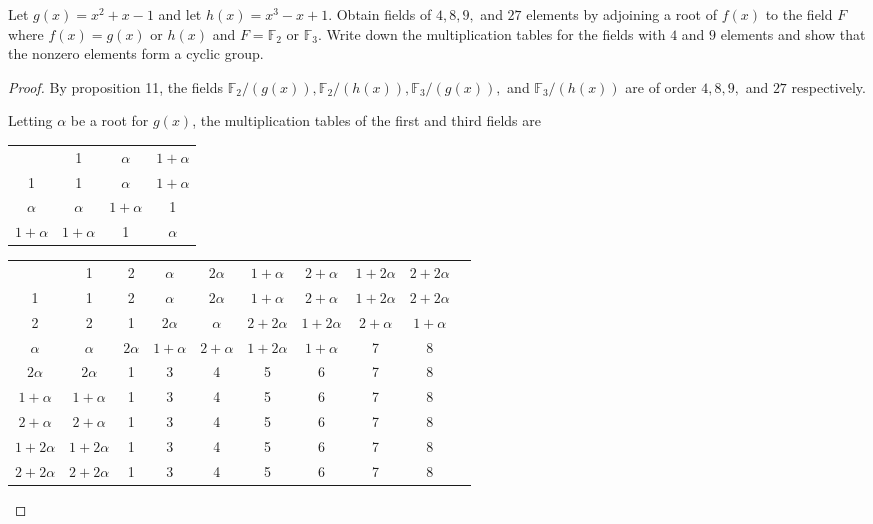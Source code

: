 \documentclass[10pt]{article}
\newenvironment{problem}[2][Problem]{\begin{trivlist}
		\item[\hskip \labelsep {\bfseries #1}\hskip \labelsep {\bfseries #2.}]}{\end{trivlist}}
\begin{document}
	\begin{problem}{2.2}
		Let $g(x) = x^2 +x-1$ and let $h(x) = x^3-x+1$. Obtain fields of $4,8,9,$ and $27$ elements by adjoining a root of $f(x)$ to the field $F$ where $f(x)=g(x)$ or $h(x)$ and $F=\mathbb{F}_2$ or $\mathbb{F}_3$. Write down the multiplication tables for the fields with $4$ and $9$ elements and show that the nonzero elements form a cyclic group.
		\begin{proof}
			By proposition 11, the fields $\mathbb{F}_2/(g(x)), \mathbb{F}_2/(h(x)), \mathbb{F}_3/(g(x)),$ and $\mathbb{F}_3/(h(x))$ are of order $4,8,9,$ and $27$ respectively.
			
			Letting $\alpha$ be a root for $g(x)$, the multiplication tables of the first and third fields are
			\begin{center}
				\noindent\begin{tabular}{c | c c c}
					            & 1          & $\alpha$   & $1+\alpha$  \\
					\cline{1-4}
					1           & 1          & $\alpha$   & $1+\alpha$  \\
					$\alpha$    & $\alpha$   & $1+\alpha$ & 1 \\
					$1+\alpha$  & $1+\alpha$ & 1          & $\alpha$ \\
				\end{tabular}
				
				\noindent\begin{tabular}{c | c c c c c c c c c}
	                            & 1           & 2           & $\alpha$    & $2\alpha$   & $1+\alpha$  & $2+\alpha$  & $1+2\alpha$ & $2+2\alpha$ \\
					\cline{1-9}
					1           & 1           & 2           & $\alpha$    & $2\alpha$   & $1+\alpha$  & $2+\alpha$  & $1+2\alpha$ & $2+2\alpha$ \\
					2           & 2           & 1           & $2\alpha$   & $\alpha$    & $2+2\alpha$ & $1+2\alpha$ & $2+\alpha$  & $1+\alpha$  \\
					$\alpha$    & $\alpha$    & $2\alpha$   & $1+\alpha$  &  $2+\alpha$ & $1+2\alpha$ & $1+\alpha$  & 7 & 8 \\
					$2\alpha$   & $2\alpha$   & 1 & 3 & 4 & 5 & 6 & 7 & 8 \\
					$1+\alpha$  & $1+\alpha$  & 1 & 3 & 4 & 5 & 6 & 7 & 8 \\
					$2+\alpha$  & $2+\alpha$  & 1 & 3 & 4 & 5 & 6 & 7 & 8 \\
					$1+2\alpha$ & $1+2\alpha$ & 1 & 3 & 4 & 5 & 6 & 7 & 8 \\
					$2+2\alpha$ & $2+2\alpha$ & 1 & 3 & 4 & 5 & 6 & 7 & 8 \\
			\end{tabular}
		\end{center}
		\end{proof}
	\end{problem}
	
\end{document}
